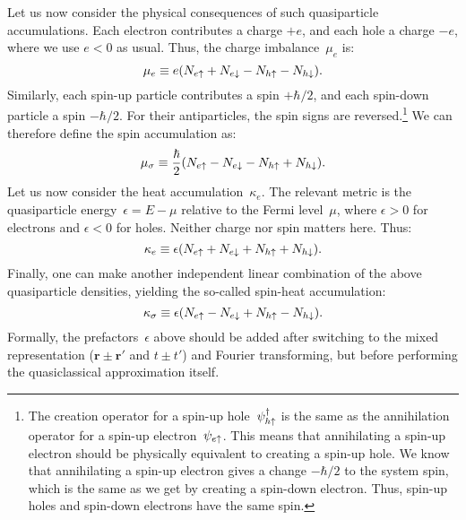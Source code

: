 Let us now consider the physical consequences of such quasiparticle accumulations.
Each electron contributes a charge $+e$, and each hole a charge $-e$, where we use $e<0$ as usual.
Thus, the charge imbalance~$\mu_e$ is:
\begin{equation}
  \mu_e \equiv e(N_{e\uparrow} + N_{e\downarrow} - N_{h\uparrow} - N_{h\downarrow}).
\end{equation}
Similarly, each spin-up particle contributes a spin $+\hbar/2$, and each spin-down particle a spin $-\hbar/2$.
For their antiparticles, the spin signs are reversed.\footnote{The creation operator for a spin-up hole~$\psi_{h\uparrow}^\dagger$ is the same as the annihilation operator for a spin-up electron~$\psi_{e\uparrow}$. This means that annihilating a spin-up electron should be physically equivalent to creating a spin-up hole. We know that annihilating a spin-up electron gives a change $-\hbar/2$ to the system spin, which is the same as we get by creating a spin-down electron. Thus, spin-up holes and spin-down electrons have the same spin.}
We can therefore define the spin accumulation as:
\begin{equation}
  \mu_\sigma \equiv \frac{\hbar}{2} (N_{e\uparrow} - N_{e\downarrow} - N_{h\uparrow} + N_{h\downarrow}).
\end{equation}
Let us now consider the heat accumulation~$\kappa_e$.
The relevant metric is the quasiparticle energy~$\epsilon = E - \mu$ relative to the Fermi level~$\mu$, where $\epsilon > 0$ for electrons and $\epsilon < 0$ for holes.
Neither charge nor spin matters here. Thus:
\begin{equation}
  \kappa_e \equiv \epsilon(N_{e\uparrow} + N_{e\downarrow} + N_{h\uparrow} + N_{h\downarrow}).
\end{equation}
Finally, one can make another independent linear combination of the above quasiparticle densities, yielding the so-called spin-heat accumulation:
\begin{equation}
  \kappa_\sigma \equiv \epsilon(N_{e\uparrow} - N_{e\downarrow} + N_{h\uparrow} - N_{h\downarrow}).
\end{equation}
Formally, the prefactors~$\epsilon$ above should be added after switching to the mixed representation ($\bm{r}\pm\bm{r}'$ and $t \pm t'$) and Fourier transforming, but before performing the quasiclassical approximation itself.

